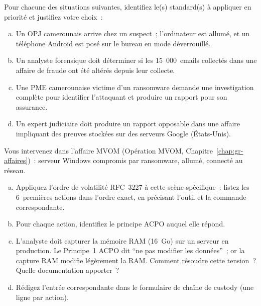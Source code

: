\bigskip

\begin{boxexo}[title={\ding{45}\quad Exercice~7.1. Sélection de standard \niveaubase}]
Pour chacune des situations suivantes, identifiez le(s) standard(s) à
appliquer en priorité et justifiez votre choix~:
\begin{enumerate}[(a)]
    \item Un OPJ camerounais arrive chez un suspect~; l'ordinateur est allumé,
          et un téléphone Android est posé sur le bureau en mode déverrouillé.
    \item Un analyste forensique doit déterminer si les 15~000~emails
          collectés dans une affaire de fraude ont été altérés depuis leur
          collecte.
    \item Une PME camerounaise victime d'un ransomware demande une investigation
          complète pour identifier l'attaquant et produire un rapport
          pour son assurance.
    \item Un expert judiciaire doit produire un rapport opposable dans
          une affaire impliquant des preuves stockées sur des serveurs
          Google (États-Unis).
\end{enumerate}
\end{boxexo}

\begin{boxexo}[title={\ding{45}\quad Exercice~7.2. Application ACPO + RFC~3227 \niveaumoyen}]
Vous intervenez dans l'affaire MVOM (Opération MVOM, Chapitre~\ref{chap:gr-affaires})~:
serveur Windows compromis par ransomware, allumé, connecté au réseau.
\begin{enumerate}[(a)]
    \item Appliquez l'ordre de volatilité RFC~3227 à cette scène spécifique~:
          listez les 6~premières actions dans l'ordre exact, en précisant
          l'outil et la commande correspondante.
    \item Pour chaque action, identifiez le principe ACPO auquel elle répond.
    \item L'analyste doit capturer la mémoire RAM (16~Go) sur un serveur
          en production. Le Principe~1 ACPO dit ``ne pas modifier les données''~;
          or la capture RAM modifie légèrement la RAM. Comment résoudre
          cette tension~? Quelle documentation apporter~?
    \item Rédigez l'entrée correspondante dans le formulaire de chaîne
          de custody (une ligne par action).
\end{enumerate}
\end{boxexo}

